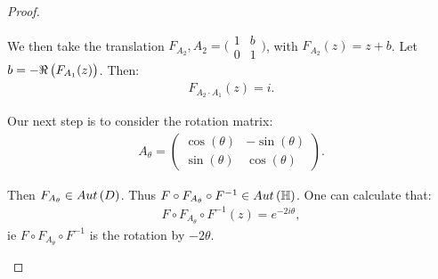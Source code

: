 \begin{proof}
\begin{enumerate}
\begin{center}
\end{center}

We then take the translation $F_{A_2}, A_2 = \big(\begin{smallmatrix}
  1 & b\\
  0 & 1
\end{smallmatrix}\big)$, with $F_{A_2} (z) = z+b$. Let $b = - \Re \left( F_{A_1} (z) \right)$. Then:
\begin{align*}
    F_{A_2 \cdot A_1} (z) = i.
\end{align*}

Our next step is to consider the rotation matrix:
\begin{align*}
    A_\theta = \begin{pmatrix}
  \cos(\theta) & -\sin( \theta)\\
  \sin (\theta) & \cos ( \theta)
\end{pmatrix}.
\end{align*}

Then $F_{A_\theta} \in Aut \left( D \right)$. Thus $F \circ F_{A_\theta} \circ F^{-1} \in Aut \left( \mathbb{H} \right)$. One can calculate that:
\begin{align*}
    F \circ F_{A_\theta} \circ F^{-1} (z)= e^{-2 i \theta},
\end{align*}
ie $F \circ F_{A_\theta} \circ F^{-1}$ is the rotation by $-2 \theta$.


\end{enumerate}
\end{proof}
